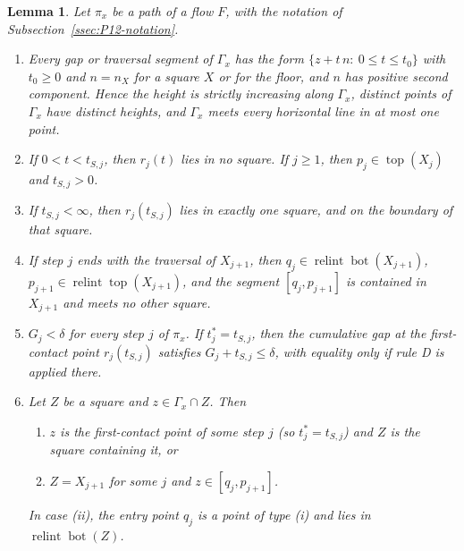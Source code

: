 \documentclass[11pt]{amsart}
\newcommand{\relint}{\operatorname{relint}}
\newcommand{\Bot}{\operatorname{bot}}
\newcommand{\Top}{\operatorname{top}}
\newtheorem{lemma}[theorem]{Lemma}
\theoremstyle{definition}
\theoremstyle{remark}
\numberwithin{equation}{section}
\begin{document}
\begin{lemma}\label{lem:P12-traj}
Let $\pi_x$ be a path of a flow $F$, with the notation of Subsection~\ref{ssec:P12-notation}.
\begin{enumerate}[label=\textup{(F\arabic*)}]
\item Every gap or traversal segment of $\Gamma_x$ has the form $\{z+t\,n:\ 0\le t\le t_0\}$ with $t_0\ge0$ and $n=n_X$ for a square $X$ or for the floor, and $n$ has positive second component. Hence the height is strictly increasing along $\Gamma_x$, distinct points of $\Gamma_x$ have distinct heights, and $\Gamma_x$ meets every horizontal line in at most one point.
\item If $0<t<t_{S,j}$, then $r_j(t)$ lies in no square. If $j\ge1$, then $p_j\in\Top(X_j)$ and $t_{S,j}>0$.
\item If $t_{S,j}<\infty$, then $r_j(t_{S,j})$ lies in exactly one square, and on the boundary of that square.
\item If step $j$ ends with the traversal of $X_{j+1}$, then $q_j\in\relint\Bot(X_{j+1})$, $p_{j+1}\in\relint\Top(X_{j+1})$, and the segment $[q_j,p_{j+1}]$ is contained in $X_{j+1}$ and meets no other square.
\item $G_j<\delta$ for every step $j$ of $\pi_x$. If $t^*_j=t_{S,j}$, then the cumulative gap at the first-contact point $r_j(t_{S,j})$ satisfies $G_j+t_{S,j}\le\delta$, with equality only if rule D is applied there.
\item Let $Z$ be a square and $z\in\Gamma_x\cap Z$. Then
\begin{enumerate}[label=\textup{(\roman*)}]
\item $z$ is the first-contact point of some step $j$ \textup{(}so $t^*_j=t_{S,j}$\textup{)} and $Z$ is the square containing it, or
\item $Z=X_{j+1}$ for some $j$ and $z\in[q_j,p_{j+1}]$.
\end{enumerate}
In case \textup{(ii)}, the entry point $q_j$ is a point of type \textup{(i)} and lies in $\relint\Bot(Z)$.
\end{enumerate}
\end{lemma}
\end{document}
